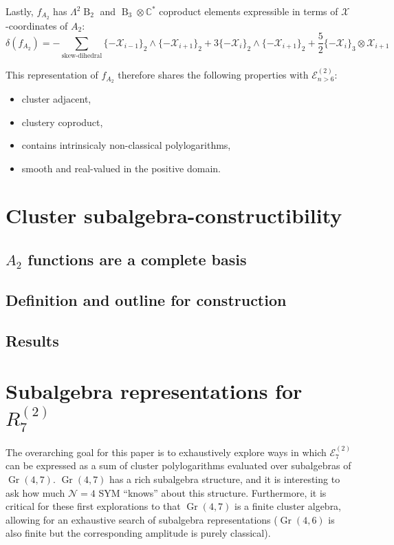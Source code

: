 \documentclass[11pt]{article}
\DeclareMathOperator{\B}{B}
\DeclareMathOperator{\Gr}{Gr}
\def\x{\mathcal{X}}
\def\xcoords{$\mathcal{X}$-coordinates }
\def\pdfeq#1{\texorpdfstring{$#1$}{a}}
\begin{document}
Lastly, $f_{A_2}$ has $\Lambda^2\B_2$ and $\B_3 \otimes \mathbb{C}^*$ coproduct elements expressible in terms of \xcoords of $A_2$:
\begin{equation}
	\delta\left(f_{A_2}\right) = -\sum_{\text{skew-dihedral}} \{-\x_{i-1}\}_2 \wedge \{-\x_{i+1}\}_2 + 3\{-\x_{i}\}_2 \wedge \{-\x_{i+1}\}_2 + \frac{5}{2}\{-\x_{i}\}_3 \otimes \x_{i+1}
\end{equation}

This representation of $f_{A_2}$ therefore shares the following properties with $\mathcal{E}^{(2)}_{n>6}$:
\begin{itemize}
	\item cluster adjacent,
	\item clustery coproduct,
	\item contains intrinsicaly non-classical polylogarithms,
	\item smooth and real-valued in the positive domain.
\end{itemize}


\section{Cluster subalgebra-constructibility} 

\subsection{\pdfeq{A_2} functions are a complete basis}
\subsection{Definition and outline for construction}



\subsection{Results}

\section{Subalgebra representations for \pdfeq{R_7^{(2)}}} 

The overarching goal for this paper is to exhaustively explore ways in which $\mathcal{E}^{(2)}_{7}$ can be expressed as a sum of cluster polylogarithms evaluated over subalgebras of $\Gr(4,7)$. $\Gr(4,7)$ has a rich subalgebra structure, and it is interesting to ask how much $\mathcal{N}=4$ SYM ``knows'' about this structure. Furthermore, it is critical for these first explorations to that $\Gr(4,7)$ is a finite cluster algebra, allowing for an exhaustive search of subalgebra representations ($\Gr(4,6)$ is also finite but the corresponding amplitude is purely classical). 
\end{document}

